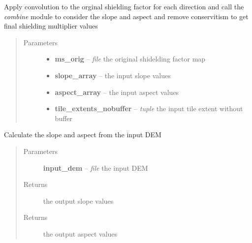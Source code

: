 \documentclass[letterpaper,10pt,english]{sphinxmanual}
\begin{document}
\begin{fulllineitems}
\label{docs/shielding:shield_mult.convo_combine}
Apply convolution to the orginal shielding factor for each direction and
call the \emph{combine} module to consider the slope and aspect and remove
conservitism to get final shielding multiplier values
\begin{quote}\begin{description}
\item[{Parameters}] \leavevmode\begin{itemize}
\item {} 
\textbf{ms\_orig} -- \emph{file} the original shidelding factor map

\item {} 
\textbf{slope\_array} --  the input slope values

\item {} 
\textbf{aspect\_array} --  the input aspect values

\item {} 
\textbf{tile\_extents\_nobuffer} -- \emph{tuple} the input tile extent without buffer

\end{itemize}

\end{description}\end{quote}

\end{fulllineitems}



\begin{fulllineitems}
\label{docs/shielding:shield_mult.get_slope_aspect}
Calculate the slope and aspect from the input DEM
\begin{quote}\begin{description}
\item[{Parameters}] \leavevmode
\textbf{input\_dem} -- \emph{file} the input DEM

\item[{Returns}] \leavevmode
{} the output slope values

\item[{Returns}] \leavevmode
{} the output aspect values

\end{description}\end{quote}

\end{fulllineitems}
\end{document}
